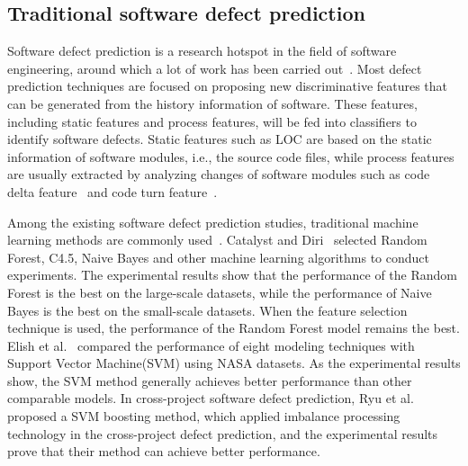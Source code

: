 \documentclass[journal]{IEEEtran}
\begin{document}
\subsection{Traditional software defect prediction}
Software defect prediction is a research hotspot in the field of software engineering, around which a lot of work has been carried out~\cite{wang2018deep,fan2019deep,menzies2006data}. 
Most defect prediction techniques are focused on proposing new discriminative features that can be generated from the history information of software. These features, including static features and process features, will be fed into classifiers to identify software defects. Static features such as LOC are based on the static information of software modules, i.e., the source code files, while process features are usually extracted by analyzing changes of software modules such as code delta feature~\cite{nagappan2010change} and code turn feature~\cite{nagappan2005use}.


Among the existing software defect prediction studies, traditional machine learning methods are commonly used~\cite{elish2008predicting,wen2012systematic}. Catalyst and Diri~\cite{catal2009investigating} selected Random Forest, C4.5, Naive Bayes and other machine learning algorithms to conduct experiments. The experimental results show that the performance of the Random Forest is the best on the large-scale datasets, while the performance of Naive Bayes is the best on the small-scale datasets. When the feature selection technique is used, the performance of the Random Forest model remains the best. Elish et al.~\cite{elish2008predicting} compared the performance of eight modeling techniques with Support Vector Machine(SVM) using NASA datasets. As the experimental results show, the SVM method generally achieves better performance than other comparable models. In cross-project software defect prediction, Ryu et al.~\cite{ryu2016value} proposed a SVM boosting method, which applied imbalance processing technology in the cross-project defect prediction, and the experimental results prove that their method can achieve better performance.

\end{document}
